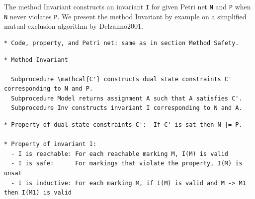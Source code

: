 \documentclass{article}
\begin{document}
The method Invariant constructs an invariant \verb=I= for given Petri net \verb=N= and \verb=P= when \verb=N= never violates \verb=P=.
We present the method Invariant by example on a simplified mutual exclusion algorithm by Delzanno2001.

\begin{verbatim}
* Code, property, and Petri net: same as in section Method Safety.
\end{verbatim}

\begin{verbatim}
* Method Invariant

  Subprocedure \mathcal{C'} constructs dual state constraints C' corresponding to N and P.
  Subprocedure Model returns assignment A such that A satisfies C'.
  Subprocedure Inv constructs invariant I corresponding to N and A.
\end{verbatim}

\begin{center}
\end{center}

\begin{verbatim}
* Property of dual state constraints C':  If C' is sat then N |= P.

* Property of invariant I:
  - I is reachable: For each reachable marking M, I(M) is valid
  - I is safe:      For markings that violate the property, I(M) is unsat
  - I is inductive: For each marking M, if I(M) is valid and M -> M1 then I(M1) is valid
\end{verbatim}
\end{document}

